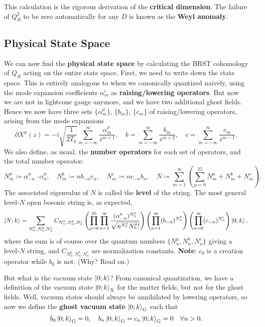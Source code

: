 \documentclass{report}
\theoremstyle{plain}
\theoremstyle{definition}
\theoremstyle{remark}
\newcommand{\di}{\partial}
\begin{document}
This calculation is the rigorous derivation of the {\bf critical
  dimension}. The failure of $Q_B^2$ to be zero automatically for any
$D$ is known as the {\bf Weyl anomaly}.

\subsection{Physical State Space}

We can now find the {\bf physical state space} by calculating the BRST
cohomology of $Q_B$ acting on the entire state space. First, we need
to write down the state space. This is entirely analogous to when we
canonically quantized naively, using the mode expansion coefficients
$\alpha_m^i$ as {\bf raising/lowering operators}. But now we are not
in lightcone gauge anymore, and we have two additional ghost fields.
Hence we now have three sets $\{\alpha_m^\mu\}$, $\{b_m\}$, $\{c_m\}$
of raising/lowering operators, arising from the mode expansions
\[ \di X^\mu(z) = -i\sqrt{\frac{1}{2T_0}} \sum_{m=-\infty}^\infty \frac{\alpha_m^\mu}{z^{m+1}}, \quad b = \sum_{m=-\infty}^\infty \frac{b_m}{z^{m+2}}, \quad c = \sum_{m=-\infty}^\infty \frac{c_m}{z^{m-1}}. \]
We also define, as usual, the {\bf number operators} for each set of
operators, and the total number operator:
\[ N_m^\mu \coloneqq \alpha^\mu_{-n} \cdot \alpha^\mu_n, \quad N_m^b \coloneqq nb_{-n} c_n, \quad N_m^c \coloneqq nc_{-n} b_n, \quad N \coloneqq \sum_{m=1}^\infty \left(\sum_{\mu=0}^{25} N_m^\mu + N_m^b + N_m^c\right). \]
The associated eigenvalue of $N$ is called the {\bf level} of the
string. The most general level-$N$ open bosonic string is, as
expected,
\[ \ket{N; k} = \sum_{N_n^{\mu}, N_n^b, N_n^c} C_{N_n^{\mu}, N_n^b, N_n^c} \left(\prod_{\mu=0}^{25} \prod_{n=1}^\infty \frac{(\alpha^\mu_{-n})^{N_n^\mu}}{\sqrt{n^{N_n^\mu} N_n^\mu!}}\right) \left(\prod_{n=1}^\infty (b_{-n})^{N_n^b}\right) \left(\prod_{n=0}^\infty (c_{-n})^{N_n^c}\right) \ket{0; k}, \]
where the sum is of course over the quantum numbers $\{N_n^{\mu},
N_n^b, N_n^c\}$ giving a level-$N$ string, and $C_{N_n^{\mu}, N_n^b,
  N_n^c}$ are normalization constants. {\bf Note}: $c_0$ is a creation
operator while $b_0$ is not. (Why? Read on.)

But what is the vacuum state $\ket{0; k}$? From canonical
quantization, we have a definition of the vacuum state $\ket{0;
  k}_{\text{X}}$ for the matter fields, but not for the ghost fields.
Well, vacuum states should always be annihilated by lowering
operators, so now we define the {\bf ghost vacuum state} $\ket{0;
  k}_{\text{G}}$ such that
\[ b_0\ket{0; k}_{\text{G}} = 0, \quad b_n\ket{0; k}_{\text{G}} = c_n\ket{0; k}_{\text{G}} = 0 \quad \forall n > 0. \]
\end{document}
